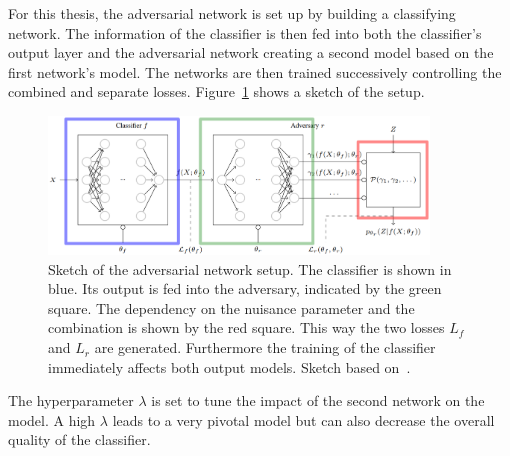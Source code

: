 For this thesis, the adversarial network is set up by building a classifying network. The information of the classifier is then fed into both the classifier's output layer and the adversarial network creating a second model based on the first network's model. The networks are then trained successively controlling the combined and separate losses. Figure~\ref{fig:ANN_sketch} shows a sketch of the setup.
%
\begin{figure}[htbp]
	\centering
	\includegraphics[width=0.9\textwidth]{figures_ML/ANN_paper}
	\caption[Adversarial setup sketched]{Sketch of the adversarial network setup. The classifier is shown in blue. Its output is fed into the adversary, indicated by the green square. The dependency on the nuisance parameter and the combination is shown by the red square. This way the two losses $L_{f}$ and $L_{r}$ are generated. Furthermore the training of the classifier immediately affects both output models. Sketch based on~\cite{Louppe:2016ylz}.}
	\label{fig:ANN_sketch}
\end{figure}
%
The hyperparameter $\lambda$ is set to tune the impact of the second network on the model. A high $\lambda$ leads to a very pivotal model but can also decrease the overall quality of the classifier.

